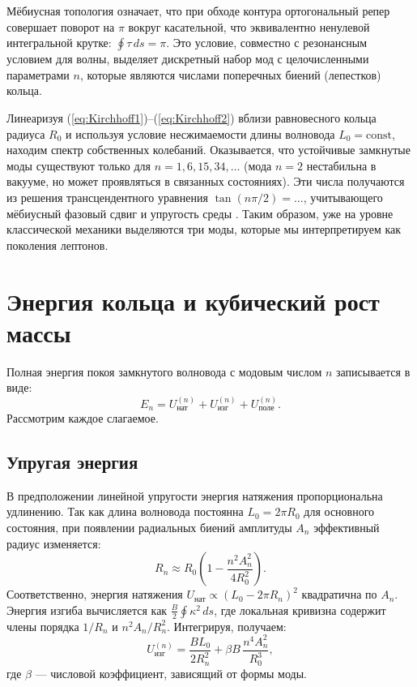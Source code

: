 \documentclass[12pt,a4paper]{article}
\begin{document}
	Мёбиусная топология означает, что при обходе контура ортогональный репер совершает поворот на $\pi$ вокруг касательной, что эквивалентно ненулевой интегральной крутке: $\oint \tau\,ds = \pi$. Это условие, совместно с резонансным условием для волны, выделяет дискретный набор мод с целочисленными параметрами $n$, которые являются числами поперечных биений (лепестков) кольца.
	
	Линеаризуя (\ref{eq:Kirchhoff1})--(\ref{eq:Kirchhoff2}) вблизи равновесного кольца радиуса $R_0$ и используя условие несжимаемости длины волновода $L_0 = \text{const}$, находим спектр собственных колебаний. Оказывается, что устойчивые замкнутые моды существуют только для $n = 1, 6, 15, 34, \dots$ (мода $n=2$ нестабильна в вакууме, но может проявляться в связанных состояниях). Эти числа получаются из решения трансцендентного уравнения $\tan(n\pi/2) = \dots$, учитывающего мёбиусный фазовый сдвиг и упругость среды \cite{Gavrilov}. Таким образом, уже на уровне классической механики выделяются три моды, которые мы интерпретируем как поколения лептонов.
	
	\section{Энергия кольца и кубический рост массы}
	Полная энергия покоя замкнутого волновода с модовым числом $n$ записывается в виде:
	\begin{equation}\label{eq:En}
		E_n = U_{\text{нат}}^{(n)} + U_{\text{изг}}^{(n)} + U_{\text{поле}}^{(n)}.
	\end{equation}
	Рассмотрим каждое слагаемое.
	
	\subsection{Упругая энергия}
	В предположении линейной упругости энергия натяжения пропорциональна удлинению. Так как длина волновода постоянна $L_0 = 2\pi R_0$ для основного состояния, при появлении радиальных биений амплитуды $A_n$ эффективный радиус изменяется:
	\begin{equation}
		R_n \approx R_0\left(1 - \frac{n^2 A_n^2}{4R_0^2}\right).
	\end{equation}
	Соответственно, энергия натяжения $U_{\text{нат}} \propto (L_0 - 2\pi R_n)^2$ квадратична по $A_n$. Энергия изгиба вычисляется как $\frac{B}{2}\oint \kappa^2\,ds$, где локальная кривизна содержит члены порядка $1/R_n$ и $n^2 A_n/R_n^2$. Интегрируя, получаем:
	\begin{equation}
		U_{\text{изг}}^{(n)} = \frac{B L_0}{2R_n^2} + \beta B\,\frac{n^4 A_n^2}{R_0^3},
	\end{equation}
	где $\beta$ — числовой коэффициент, зависящий от формы моды.
	
\end{document}
